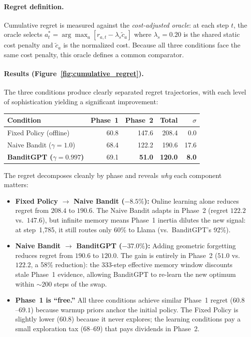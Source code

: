 \paragraph{Regret definition.}
Cumulative regret is measured against the \emph{cost-adjusted oracle}:
at each step $t$, the oracle selects
$a^*_t = \arg\max_a [r_{a,t} - \lambda_s \tilde{c}_a]$
where $\lambda_s{=}0.20$ is the shared static cost penalty
and $\tilde{c}_a$ is the normalized cost.
Because all three conditions face the same cost penalty, this
oracle defines a common comparator.

\paragraph{Results (Figure~\ref{fig:cumulative_regret}).}
The three conditions produce clearly separated regret trajectories,
with each level of sophistication yielding a significant
improvement:

\begin{center}
\begin{tabular}{lrrrr}
\toprule
Condition & Phase~1 & Phase~2 & Total & $\sigma$ \\
\midrule
Fixed Policy (offline) & 60.8 & 147.6 & 208.4 & 0.0 \\
Naive Bandit ($\gamma{=}1.0$) & 68.4 & 122.2 & 190.6 & 17.6 \\
\textbf{BanditGPT ($\gamma{=}0.997$)} & 69.1 & \textbf{51.0} & \textbf{120.0} & \textbf{8.0} \\
\bottomrule
\end{tabular}
\end{center}

\noindent
The regret decomposes cleanly by phase and reveals \emph{why}
each component matters:

\begin{itemize}[nosep,leftmargin=*]
  \item \textbf{Fixed Policy $\to$ Naive Bandit ($-8.5\%$):}
    Online learning alone reduces regret from $208.4$ to $190.6$.
    The Naive Bandit adapts in Phase~2 (regret $122.2$ vs.\ $147.6$),
    but infinite memory means Phase~1 inertia dilutes the new signal:
    at step~1{,}785, it still routes only 60\% to Llama
    (vs.\ BanditGPT's 92\%).

  \item \textbf{Naive Bandit $\to$ BanditGPT ($-37.0\%$):}
    Adding geometric forgetting reduces regret from $190.6$ to
    $120.0$.  The gain is entirely in Phase~2 ($51.0$ vs.\ $122.2$,
    a 58\% reduction): the 333-step effective memory window
    discounts stale Phase~1 evidence, allowing BanditGPT to
    re-learn the new optimum within ${\sim}200$ steps of the swap.

  \item \textbf{Phase~1 is ``free.''}
    All three conditions achieve similar Phase~1 regret
    ($60.8$--$69.1$) because warmup priors anchor the initial
    policy.  The Fixed Policy is slightly lower ($60.8$) because
    it never explores; the learning conditions pay a small
    exploration tax ($68$--$69$) that pays dividends in Phase~2.
\end{itemize}

